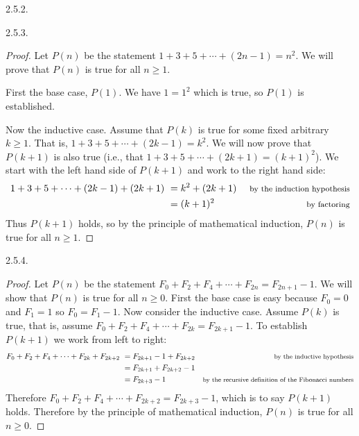 \begin {itemize}
\begin{ans}{2.5.2.}
\end{ans}
\begin{ans}{2.5.3.}
		\begin{proof}
		 Let $P(n)$ be the statement $1+3 +5 + \cdots + (2n-1) = n^2$.  We will prove that $P(n)$ is true for all $n \ge 1$.

		 First the base case, $P(1)$.  We have $ 1 = 1^2$ which is true, so $P(1)$ is established.

		 Now the inductive case.  Assume that $P(k)$ is true for some fixed arbitrary $k \ge 1$.  That is, $1 + 3 + 5 + \cdots + (2k-1) = k^2$.  We will now prove that $P(k+1)$ is also true (i.e., that $1 + 3 + 5 + \cdots + (2k+1) = (k+1)^2$).  We start with the left hand side of $P(k+1)$ and work to the right hand side:
		 \begin{align*}
		  1 + 3 + 5 + \cdots + (2k-1) + (2k+1) ~ & = k^2 + (2k+1) & \mbox{ \footnotesize by the induction hypothesis}\\
		  & = (k+1)^2 & \mbox{ \footnotesize by factoring}
		 \end{align*}
		Thus $P(k+1)$ holds, so by the principle of mathematical induction, $P(n)$ is true for all $n \ge 1$.
		\end{proof}
	
\end{ans}
\begin{ans}{2.5.4.}
		\begin{proof}
		 Let $P(n)$ be the statement $F_0 + F_2 + F_4 + \cdots + F_{2n} = F_{2n+1} - 1$.  We will show that $P(n)$ is true for all $n \ge 0$.  First the base case is easy because $F_0 = 0$ and $F_1 = 1$ so $F_0 = F_1 - 1$.  Now consider the inductive case.  Assume $P(k)$ is true, that is, assume $F_0 + F_2 + F_4 + \cdots + F_{2k} = F_{2k+1} - 1$.  To establish $P(k+1)$ we work from left to right:
		 \begin{align*}
		  F_0 + F_2 + F_4 + \cdots + F_{2k} + F_{2k+2} ~ & = F_{2k+1} - 1 + F_{2k+2} & \mbox{\footnotesize by the inductive hypothesis}\\
		  & = F_{2k+1} + F_{2k+2} - 1 & \\
		  & = F_{2k+3} - 1 & \mbox{\footnotesize by the recursive definition of the Fibonacci numbers}
		 \end{align*}
		Therefore $F_0 + F_2 + F_4 + \cdots + F_{2k+2} = F_{2k+3} - 1$, which is to say $P(k+1)$ holds.  Therefore by the principle of mathematical induction, $P(n)$ is true for all $n \ge 0$.
		\end{proof}
	

\end{ans}
\end{itemize}
